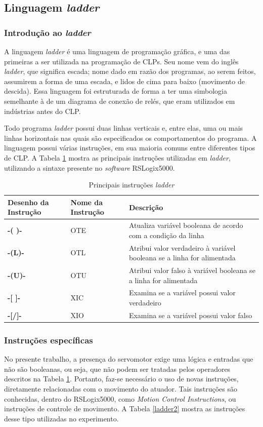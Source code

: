 \subsection{Linguagem \textit{ladder}}
\subsubsection{Introdução ao \textit{ladder}}
A linguagem \textit{ladder} é uma linguagem de programação gráfica, e uma das primeiras a ser utilizada na programação de CLPs. Seu nome vem do inglês \textit{ladder}, que significa escada; nome dado em razão dos programas, ao serem feitos, assumirem a forma de uma escada, e lidos de cima para baixo (movimento de descida). Essa linguagem foi estruturada de forma a ter uma simbologia semelhante à de um diagrama de conexão de relés, que eram utilizados em indústrias antes do CLP.

Todo programa \textit{ladder} possui duas linhas verticais e, entre elas, uma ou mais linhas horizontais nas quais são especificados os comportamentos do programa. A linguagem possui várias instruções, em sua maioria comuns entre diferentes tipos de CLP. A Tabela \ref{ladder1} mostra as principais instruções utilizadas em \textit{ladder}, utilizando a sintaxe presente no \textit{software} RSLogix5000.

\begin{table}[!ht]
  \centering
  \caption{Principais instruções \textit{ladder} \label{ladder1}}
  \begin{tabularx}{\textwidth}{|>{\bfseries}l|l|X|}
    \hline
    Desenho da Instrução & Nome da Instrução & Descrição \\ \hline
    -( )- & OTE & Atualiza variável booleana de acordo com a condição da linha \\ \hline
    -(L)- & OTL & Atribui valor verdadeiro à variável booleana se a linha for alimentada \\ \hline
    -(U)- & OTU & Atribui valor falso à variável booleana se a linha for alimentada \\ \hline
    -[ ]- & XIC & Examina se a variável possui valor verdadeiro \\ \hline
    -[/]- & XIO & Examina se a variável possui valor falso \\ \hline
  \end{tabularx}
\end{table}

\subsubsection{Instruções específicas}
No presente trabalho, a presença do servomotor exige uma lógica e entradas que não são booleanas, ou seja, que não podem ser tratadas pelos operadores descritos na Tabela \ref{ladder1}. Portanto, faz-se necessário o uso de novas instruções, diretamente relacionadas com o movimento do atuador. Tais instruções são conhecidas, dentro do RSLogix5000, como \textit{Motion Control Instructions}, ou instruções de controle de movimento. A Tabela \ref{ladder2} mostra as instruções desse tipo utilizadas no experimento.

